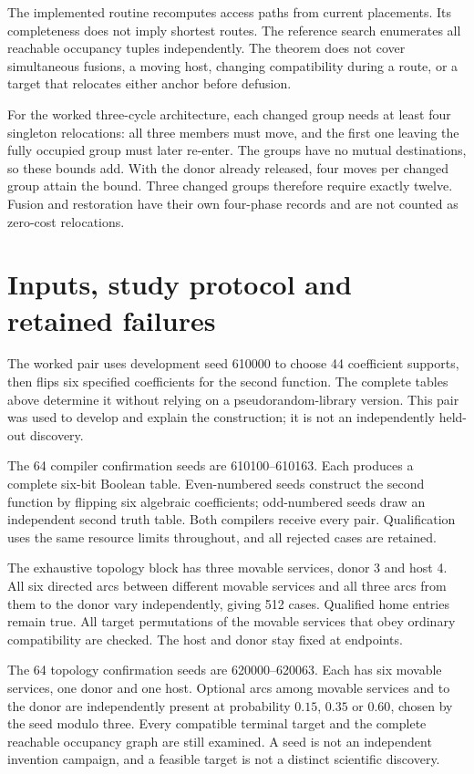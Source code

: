 \documentclass[11pt,letterpaper]{article}
\theoremstyle{definition}\newtheorem{definition}[theorem]{Definition}
\theoremstyle{remark}\newtheorem{remark}[theorem]{Remark}
\begin{document}
The implemented routine recomputes access paths from current placements. Its completeness does not imply shortest routes. The reference search enumerates all reachable occupancy tuples independently. The theorem does not cover simultaneous fusions, a moving host, changing compatibility during a route, or a target that relocates either anchor before defusion.

For the worked three-cycle architecture, each changed group needs at least four singleton relocations: all three members must move, and the first one leaving the fully occupied group must later re-enter. The groups have no mutual destinations, so these bounds add. With the donor already released, four moves per changed group attain the bound. Three changed groups therefore require exactly twelve. Fusion and restoration have their own four-phase records and are not counted as zero-cost relocations.

\section{Inputs, study protocol and retained failures}
\label{app:protocol}
The worked pair uses development seed 610000 to choose 44 coefficient supports, then flips six specified coefficients for the second function. The complete tables above determine it without relying on a pseudorandom-library version. This pair was used to develop and explain the construction; it is not an independently held-out discovery.

The 64 compiler confirmation seeds are 610100--610163. Each produces a complete six-bit Boolean table. Even-numbered seeds construct the second function by flipping six algebraic coefficients; odd-numbered seeds draw an independent second truth table. Both compilers receive every pair. Qualification uses the same resource limits throughout, and all rejected cases are retained.

The exhaustive topology block has three movable services, donor 3 and host 4. All six directed arcs between different movable services and all three arcs from them to the donor vary independently, giving 512 cases. Qualified home entries remain true. All target permutations of the movable services that obey ordinary compatibility are checked. The host and donor stay fixed at endpoints.

The 64 topology confirmation seeds are 620000--620063. Each has six movable services, one donor and one host. Optional arcs among movable services and to the donor are independently present at probability $0.15$, $0.35$ or $0.60$, chosen by the seed modulo three. Every compatible terminal target and the complete reachable occupancy graph are still examined. A seed is not an independent invention campaign, and a feasible target is not a distinct scientific discovery.
\end{document}
